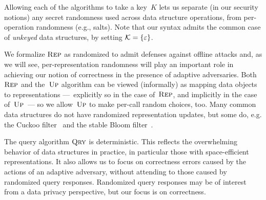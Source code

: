 Allowing each of the algorithms to take a key~$K$ lets us separate (in our
security notions) any secret randomness used across data structure operations,
from per-operation randomness (e.g., salts).  Note that our syntax admits the
common case of \emph{unkeyed} data structures, by setting
$\mathcal{K}=\{\varepsilon\}$.

We formalize $\textnormal{\textsc{Rep}}$ as randomized to admit defenses against offline attacks and,
as we will see, per-representation randomness will play an important role in
achieving our notion of correctness in the presence of adaptive adversaries.
Both~$\textnormal{\textsc{Rep}}$ and the~$\textnormal{\textsc{Up}}$ algorithm can be viewed (informally) as mapping data
objects to representations ---~explicitly so in the case of~$\textnormal{\textsc{Rep}}$, and
implicitly in the case of~$\textnormal{\textsc{Up}}$~--- so we allow~$\textnormal{\textsc{Up}}$ to make per-call random
choices, too.  Many common data structures do not have randomized representation
updates, but some do, e.g. the Cuckoo filter~\cite{fan2014cuckoo} and the stable
Bloom filter~\cite{deng2006approximately}.

The query algorithm $\textnormal{\textsc{Qry}}$ is deterministic.  This reflects the overwhelming
behavior of data structures in practice, in particular those with
space-efficient representations. It also allows us to focus on correctness
errors caused by the actions of an adaptive adversary, without attending to
those caused by randomized query responses.  Randomized query responses may be
of interest from a data privacy perspective, but our focus is on correctness.

